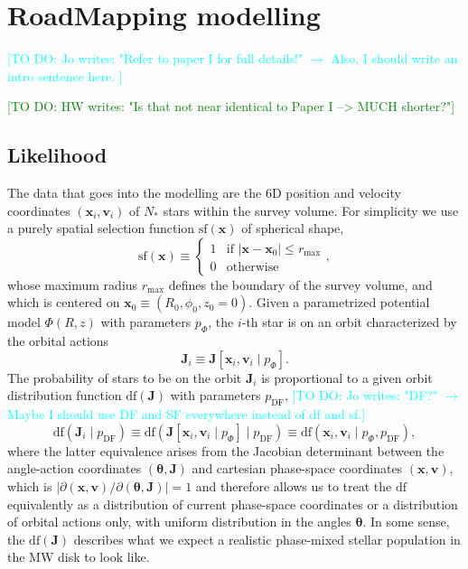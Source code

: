 \documentclass[iop,revtex4,numberedappendix,appendixfloats]{emulateapj}
\newcommand{\vect}[1]{\boldsymbol{#1}}
\newcommand{\HW}[1]{\textcolor{Green}{#1}}
\newcommand{\Jo}[1]{\textcolor{Cyan}{#1}}
\begin{document}
\section{RoadMapping modelling} \label{sec:RoadMapping}

\Jo{[TO DO: Jo writes: "Refer to paper I for full details!" $\longrightarrow$ Also, I should write an intro sentence here. ]}

\HW{[TO DO: HW writes: "Is that not near identical to Paper I --> MUCH shorter?"]}

\subsection{Likelihood} \label{sec:likelihood}

The data that goes into the modelling are the 6D position and velocity coordinates $(\vect{x}_i,\vect{v}_i)$ of $N_*$ stars within the survey volume. For simplicity we use a purely spatial selection function $\text{sf}(\vect{x})$ of spherical shape,
\begin{equation*}
\text{sf}(\vect{x}) \equiv \begin{cases} 1 &\mbox{if } \left| \vect{x}-\vect{x}_0 \right| \leq r_\text{max} \\
0 & \mbox{otherwise} \end{cases},
\end{equation*}
whose maximum radius $r_\text{max}$ defines the boundary of the survey volume, and which is centered on $\vect{x}_0 \equiv (R_0,\phi_0,z_0=0)$. Given a parametrized potential model $\Phi(R,z)$ with parameters $p_\Phi$, the $i$-th star is on an orbit characterized by the orbital actions 
\begin{equation*}
\vect{J}_i \equiv \vect{J}[\vect{x}_i,\vect{v}_i \mid p_\Phi].
\end{equation*}
The probability of stars to be on the orbit $\vect{J}_i$ is proportional to a given orbit distribution function $\text{df}(\vect{J})$ with parameters $p_\text{DF}$,
\Jo{[TO DO: Jo writes: "DF?" $\longrightarrow$ Maybe I should use DF and SF everywhere instead of df and sf.]}
\begin{equation*}
\text{df}(\vect{J}_i \mid p_\text{DF}) \equiv \text{df}(\vect{J}[\vect{x}_i,\vect{v}_i \mid p_\Phi] \mid p_\text{DF}) \equiv \text{df}(\vect{x}_i,\vect{v}_i \mid p_\Phi,p_\text{DF}),
\end{equation*} 
where the latter equivalence arises from the Jacobian determinant between the angle-action coordinates $(\vect{\theta},\vect{J})$ and cartesian phase-space coordinates $(\vect{x},\vect{v})$, which is $\left| \partial (\vect{x},\vect{v}) / \partial(\vect{\theta},\vect{J})\right|=1$ and therefore allows us to treat the $\text{df}$ equivalently as a distribution of current phase-space coordinates or a distribution of orbital actions only, with uniform distribution in the angles $\vect{\theta}$. In some sense, the $\text{df}(\vect{J})$ describes what we expect a realistic phase-mixed stellar population in the MW disk to look like.
\end{document}
